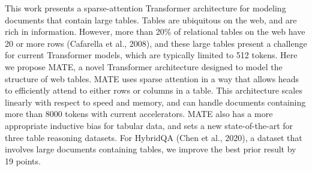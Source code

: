 This work presents a sparse-attention Transformer architecture for modeling documents that contain large tables. Tables are ubiquitous on the web, and are rich in information. However, more than 20\% of relational tables on the web have 20 or more rows (Cafarella et al., 2008), and these large tables present a challenge for current Transformer models, which are typically limited to 512 tokens. Here we propose MATE, a novel Transformer architecture designed to model the structure of web tables. MATE uses sparse attention in a way that allows heads to efficiently attend to either rows or columns in a table. This architecture scales linearly with respect to speed and memory, and can handle documents containing more than 8000 tokens with current accelerators. MATE also has a more appropriate inductive bias for tabular data, and sets a new state-of-the-art for three table reasoning datasets. For HybridQA (Chen et al., 2020), a dataset that involves large documents containing tables, we improve the best prior result by 19 points.
